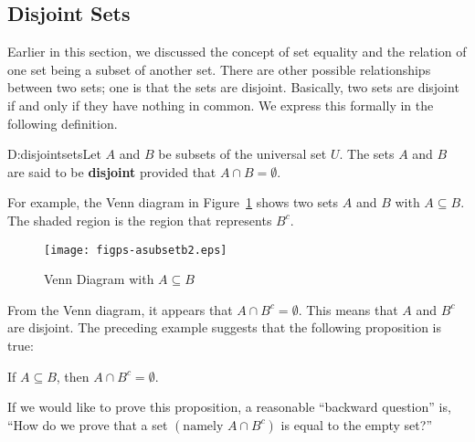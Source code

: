 \subsection*{Disjoint Sets}
Earlier in this section, we discussed the concept of set equality and the relation of one set being a subset of another set.  There are other possible relationships between two sets; one is that the sets are disjoint.  Basically, two sets are disjoint if and only if they have nothing in common.  We express this formally in the following definition.
%
\begin{defbox}{D:disjointsets}{Let  $A$  and  $B$  be subsets of the universal set  $U$.  The sets  $A$  and  $B$  are said to be \textbf{disjoint}
%
%
 provided that  $A \cap B = \emptyset $.}
\end{defbox}
%
For example, the Venn diagram in Figure~\ref{fig:asubsetb2} shows two sets  $A$  and  $B$  with  
$A \subseteq B$.  The shaded region is the region that represents $B^c$.
%
\begin{figure}[h]
\begin{center}
\texttt{[image: figps-asubsetb2.eps]}
\caption{Venn Diagram with $A \subseteq B$} \label{fig:asubsetb2}
\end{center}
\end{figure}
From the Venn diagram, it appears that  $A \cap B^c  = \emptyset $.  This means that  $A$  and  $B^c$  are disjoint.
%
The preceding example suggests that the following proposition is true:
\begin{center}
If  $A \subseteq B$, then  $A \cap B^c  = \emptyset $.
\end{center}
If we would like to prove this proposition, a reasonable ``backward question'' is, ``How do we prove that a set $\left( \text{namely } A \cap B^c \right)$ is equal to the empty set?''

